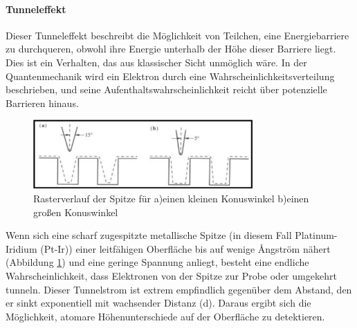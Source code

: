 \paragraph{Tunneleffekt}
Dieser Tunneleffekt beschreibt die Möglichkeit von Teilchen, eine Energiebarriere zu durchqueren, obwohl ihre Energie unterhalb der Höhe dieser Barriere liegt. Dies ist ein Verhalten, das aus klassischer Sicht unmöglich wäre. In der Quantenmechanik wird ein Elektron durch eine Wahrscheinlichkeitsverteilung beschrieben, und seine Aufenthaltswahrscheinlichkeit reicht über potenzielle Barrieren hinaus.\\
\begin{figure}[H]
\centering
\includegraphics[width=0.75\textwidth]{figs/tunnelspitze}
\caption{ Rasterverlauf der Spitze für a)einen kleinen Konuswinkel b)einen großen Konuswinkel \cite{piezo}}
\label{fig:raster}
\end{figure} 



Wenn sich eine scharf zugespitzte metallische Spitze (in diesem Fall Platinum-Iridium (Pt-Ir)) einer leitfähigen Oberfläche bis auf wenige Ångström nähert (Abbildung \ref{fig:raster}) und eine geringe Spannung anliegt, besteht eine endliche Wahrscheinlichkeit, dass Elektronen von der Spitze zur Probe oder umgekehrt tunneln. Dieser Tunnelstrom ist extrem empfindlich gegenüber dem Abstand, den er sinkt exponentiell mit wachsender Distanz (d). 
Daraus ergibt sich die Möglichkeit, atomare Höhenunterschiede auf der Oberfläche zu detektieren.


